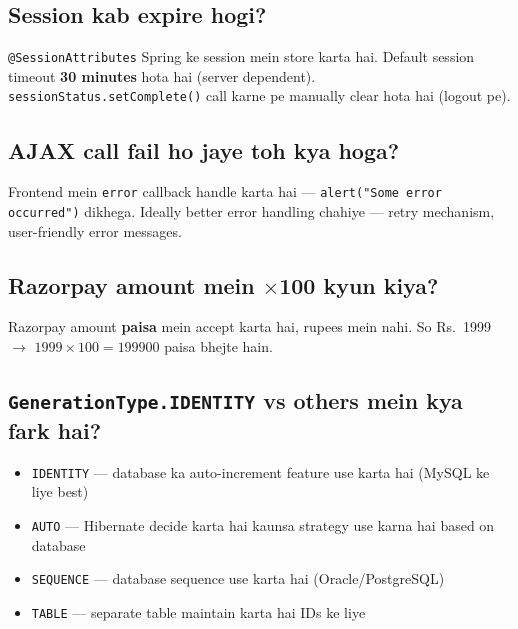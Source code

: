\documentclass[12pt,a4paper]{article}
\begin{document}
\subsection{Session kab expire hogi?}

\begin{answerbox}
\texttt{@SessionAttributes} Spring ke session mein store karta hai. Default session timeout \textbf{30 minutes} hota hai (server dependent). \texttt{sessionStatus.setComplete()} call karne pe manually clear hota hai (logout pe).
\end{answerbox}

\subsection{AJAX call fail ho jaye toh kya hoga?}

\begin{answerbox}
Frontend mein \texttt{error} callback handle karta hai --- \texttt{alert("Some error occurred")} dikhega. Ideally better error handling chahiye --- retry mechanism, user-friendly error messages.
\end{answerbox}

\subsection{Razorpay amount mein $\times$100 kyun kiya?}

\begin{answerbox}
Razorpay amount \textbf{paisa} mein accept karta hai, rupees mein nahi. So Rs.~1999 $\rightarrow$ $1999 \times 100 = 199900$ paisa bhejte hain.
\end{answerbox}

\subsection{\texttt{GenerationType.IDENTITY} vs others mein kya fark hai?}

\begin{answerbox}
\begin{itemize}
    \item \texttt{IDENTITY} --- database ka auto-increment feature use karta hai (MySQL ke liye best)
    \item \texttt{AUTO} --- Hibernate decide karta hai kaunsa strategy use karna hai based on database
    \item \texttt{SEQUENCE} --- database sequence use karta hai (Oracle/PostgreSQL)
    \item \texttt{TABLE} --- separate table maintain karta hai IDs ke liye
\end{itemize}
\end{answerbox}
\end{document}
